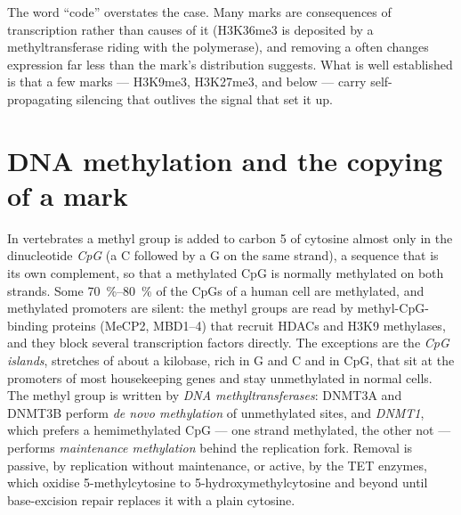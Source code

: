 \begin{remark}\label{rem:b3:chromatin-epigenetics:code}
The word ``code'' overstates the case. Many marks are consequences of
transcription rather than causes of it (H3K36me3 is deposited by a
methyltransferase riding with the polymerase), and removing a 
often changes expression far less than the mark's distribution
suggests. What is well established is that a few marks --- H3K9me3,
H3K27me3, and  below --- carry self-propagating
silencing that outlives the signal that set it up.
\end{remark}

\section{DNA methylation and the copying of a mark}

\begin{definition}\label{def:b3:chromatin-epigenetics:methylation}
In vertebrates a methyl group is added to carbon 5 of cytosine almost
only in the dinucleotide \emph{CpG} (a C followed by a G on the same
strand), a sequence that is its own complement, so that a methylated
CpG is normally methylated on both strands. Some \qtyrange{70}{80}{\%}
of the CpGs of a human cell are methylated, and methylated promoters
are silent: the methyl groups are read by methyl-CpG-binding proteins
(MeCP2, MBD1--4) that recruit HDACs and H3K9 methylases, and they
block several transcription factors directly. The exceptions are the
\emph{CpG islands}, stretches of about a kilobase, rich in G and C
and in CpG, that sit at the promoters of most housekeeping genes and
stay unmethylated in normal cells. The methyl group is written by
\emph{DNA methyltransferases}: DNMT3A and DNMT3B perform \emph{de novo
methylation} of unmethylated sites, and \emph{DNMT1}, which prefers a
hemimethylated CpG --- one strand methylated, the other not --- performs
\emph{maintenance methylation} behind the replication fork. Removal is
passive, by replication without maintenance, or active, by the TET
enzymes, which oxidise 5-methylcytosine to 5-hydroxymethylcytosine and
beyond until base-excision repair replaces it with a plain cytosine.
\end{definition}

